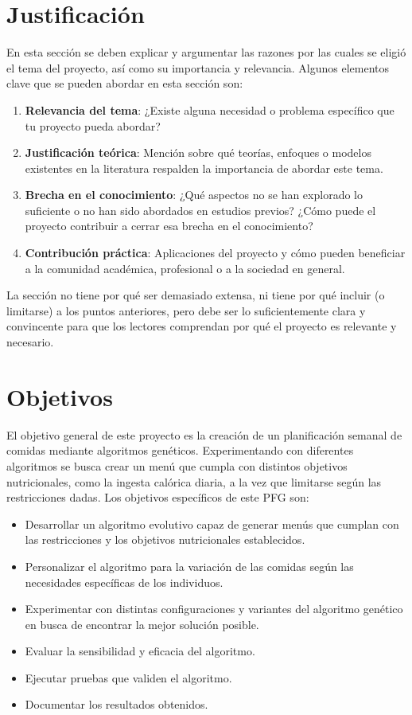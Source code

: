 \section{Justificación}

En esta sección se deben explicar y argumentar las razones por las cuales se eligió el tema del proyecto, así como su importancia y relevancia. Algunos elementos clave que se pueden abordar en esta sección son:

\begin{enumerate}
    \item \textbf{Relevancia del tema}: ¿Existe alguna necesidad o problema específico que tu proyecto pueda abordar?
    \item \textbf{Justificación teórica}: Mención sobre qué teorías, enfoques o modelos existentes en la literatura respalden la importancia de abordar este tema.
    \item \textbf{Brecha en el conocimiento}: ¿Qué aspectos no se han explorado lo suficiente o no han sido abordados en estudios previos? ¿Cómo puede el proyecto contribuir a cerrar esa brecha en el conocimiento?
    \item \textbf{Contribución práctica}: Aplicaciones del proyecto y cómo pueden beneficiar a la comunidad académica, profesional o a la sociedad en general.
\end{enumerate}

La sección no tiene por qué ser demasiado extensa, ni tiene por qué incluir (o limitarse) a los puntos anteriores, pero debe ser lo suficientemente clara y convincente para que los lectores comprendan por qué el proyecto es relevante y necesario.


\section{Objetivos}

El objetivo general de este proyecto es la creación de un planificación semanal de comidas mediante algoritmos genéticos. Experimentando con diferentes algoritmos se busca crear un menú que cumpla con distintos objetivos nutricionales, como la ingesta calórica diaria, a la vez que limitarse según las restricciones dadas. Los objetivos específicos de este PFG son:

\begin{itemize}
    \item Desarrollar un algoritmo evolutivo capaz de generar menús que cumplan con las restricciones y los objetivos nutricionales establecidos.
    \item Personalizar el algoritmo para la variación de las comidas según las necesidades específicas de los individuos.
    \item Experimentar con distintas configuraciones y variantes del algoritmo genético en busca de encontrar la mejor solución posible.
    \item Evaluar la sensibilidad y eficacia del algoritmo.
    \item Ejecutar pruebas que validen el algoritmo.
    \item Documentar los resultados obtenidos.
\end{itemize}

